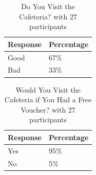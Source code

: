 \documentclass{article}
\begin{document}
\begin{longtable}[]{@{}ll@{}}
\caption{Do You Visit the Cafeteria? with 27 participants} \label{do-you-visit-the-cafeteria} \\
\toprule\noalign{}
Response & Percentage \\
\midrule\noalign{}
\endhead
\bottomrule\noalign{}
\endlastfoot
Good & 67\% \\
Bad & 33\% \\
\end{longtable}

\begin{longtable}[]{@{}ll@{}}
\caption{Would You Visit the Cafeteria if You Had a Free Voucher? with 27 participants} \label{would-you-visit-the-cafeteria-if-you-had-a-free-voucher} \\
\toprule\noalign{}
Response & Percentage \\
\midrule\noalign{}
\endhead
\bottomrule\noalign{}
\endlastfoot
Yes & 95\% \\
No & 5\% \\
\end{longtable}
\end{document}
